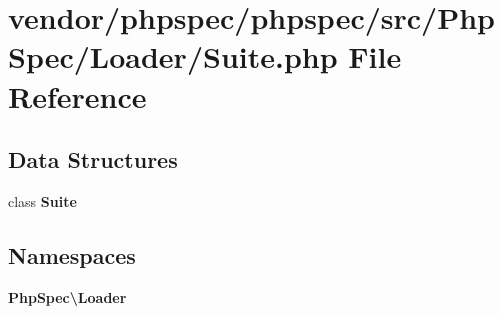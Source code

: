 \section{vendor/phpspec/phpspec/src/\+Php\+Spec/\+Loader/\+Suite.php File Reference}
\label{_suite_8php}
\subsection*{Data Structures}
\begin{DoxyCompactItemize}
\item 
class {\bf Suite}
\end{DoxyCompactItemize}
\subsection*{Namespaces}
\begin{DoxyCompactItemize}
\item 
 {\bf Php\+Spec\textbackslash{}\+Loader}
\end{DoxyCompactItemize}
